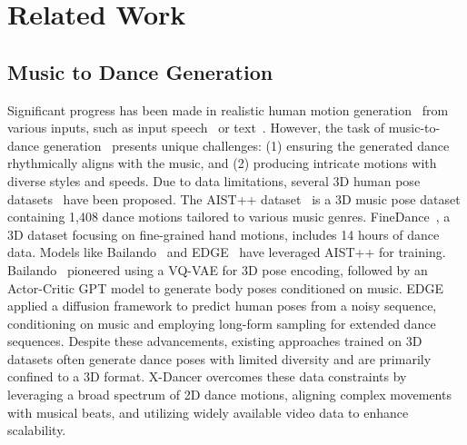 \section{Related Work}

\subsection{Music to Dance Generation}
Significant progress has been made in realistic human motion generation~\cite{zhi2023livelyspeaker,bailando,edge,lucas2022posegpt,chen2023humanmac,zhang2023generating} from various inputs, such as input speech~\cite{ginosar2019learning,qian2021speech,liu2022learning,zhang2024dr2,ao2022rhythmic} or text~\cite{tevet2023human,jiang2023motiongpt,petrovich2022temos,zhang2024motiondiffuse}. However, the task of music-to-dance generation~\cite{bailando,alexanderson2023listen, edge,li2024lodge,li2024exploring,le2023music,Luo_2024_CVPR,zhang2024bidirectional} presents unique challenges: (1) ensuring the generated dance rhythmically aligns with the music, and (2) producing intricate motions with diverse styles and speeds. Due to data limitations, several 3D human pose datasets~\cite{aist++,li2023finedance,le2023music,Luo_2024_CVPR} have been proposed. The AIST++ dataset~\cite{aist++} is a 3D music pose dataset containing 1,408 dance motions tailored to various music genres. FineDance~\cite{li2023finedance}, a 3D dataset focusing on fine-grained hand motions, includes 14 hours of dance data. Models like Bailando~\cite{bailando} and EDGE~\cite{edge} have leveraged AIST++ for training. Bailando~\cite{bailando} pioneered using a VQ-VAE for 3D pose encoding, followed by an Actor-Critic GPT model to generate body poses conditioned on music. EDGE~\cite{edge} applied a diffusion framework to predict human poses from a noisy sequence, conditioning on music and employing long-form sampling for extended dance sequences. 
Despite these advancements, existing approaches trained on 3D datasets often generate dance poses with limited diversity and are primarily confined to a 3D format. X-Dancer overcomes these data constraints by leveraging a broad spectrum of 2D dance motions, aligning complex movements with musical beats, and utilizing widely available video data to enhance scalability.

